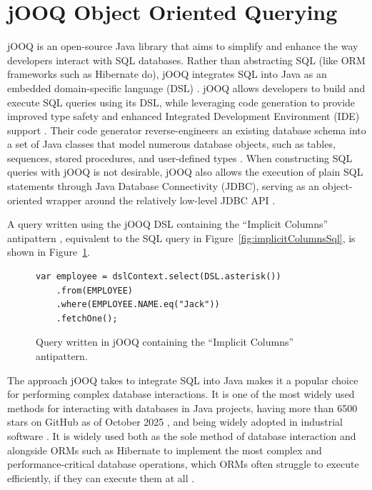 \section{jOOQ Object Oriented Querying}\label{sec:jooq}

jOOQ  is an open-source Java library that aims to simplify and enhance the way developers interact with SQL databases. Rather than abstracting SQL (like ORM frameworks such as Hibernate  do), jOOQ integrates SQL into Java as an embedded domain-specific language (DSL) . jOOQ allows developers to build and execute SQL queries using its DSL, while leveraging code generation to provide improved type safety and enhanced Integrated Development Environment (IDE) support . Their code generator reverse-engineers an existing database schema into a set of Java classes that model numerous database objects, such as tables, sequences, stored procedures, and user-defined types . When constructing SQL queries with jOOQ is not desirable, jOOQ also allows the execution of plain SQL statements through Java Database Connectivity (JDBC), serving as an object-oriented wrapper around the relatively low-level JDBC API .

A query written using the jOOQ DSL containing the “Implicit Columns” antipattern , equivalent to the SQL query in Figure~\ref{fig:implicitColumnsSql}, is shown in Figure~\ref{fig:implicitColumnsJooq}.

\begin{figure}[h]
    \begin{lstlisting}[frame=none, basicstyle=\small]
var employee = dslContext.select(DSL.asterisk())
    .from(EMPLOYEE)
    .where(EMPLOYEE.NAME.eq("Jack"))
    .fetchOne();
    \end{lstlisting}
    \caption{Query written in jOOQ containing the “Implicit Columns” antipattern.}
    \label{fig:implicitColumnsJooq}
\end{figure}

The approach jOOQ takes to integrate SQL into Java makes it a popular choice for performing complex database interactions. It is one of the most widely used methods for interacting with databases in Java projects, having more than \num{6500} stars on GitHub as of October 2025 , and being widely adopted in industrial software . It is widely used both as the sole method of database interaction and alongside ORMs such as Hibernate to implement the most complex and performance-critical database operations, which ORMs often struggle to execute efficiently, if they can execute them at all .

